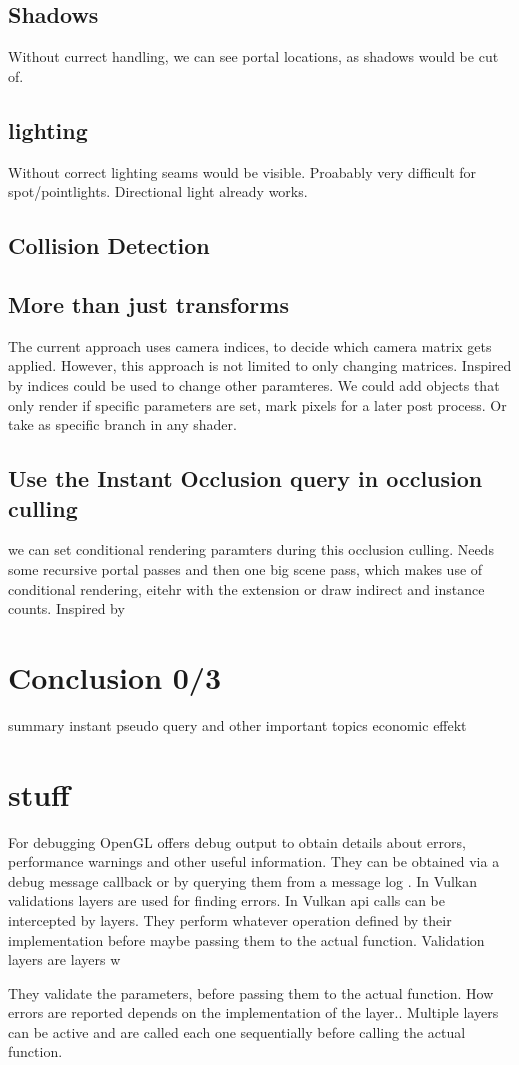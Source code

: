 \subsection{Shadows}
Without currect handling, we can see portal locations, as shadows would be cut of.
\subsection{lighting}
Without correct lighting seams would be visible. Proabably very difficult for spot/pointlights. Directional light already works.
\subsection{Collision Detection}

\subsection{More than just transforms}
\label{more than transforms}
The current approach uses camera indices, to decide which camera matrix gets applied. However, this approach is not limited to only changing matrices. Inspired by \cite{borst:2009:real} indices could be used to change other paramteres. We could add objects that only render if specific parameters are set, mark pixels for a later post process. Or take as specific branch in any shader.


\subsection{Use the Instant Occlusion query in occlusion culling}
we can set conditional rendering paramters during this occlusion culling.
Needs some  recursive portal passes and then one big scene pass, which makes use of conditional rendering, eitehr with the extension or draw indirect and instance counts. Inspired by \cite{yang:2014:walkthrough}

\section{Conclusion 0/3}

summary
instant pseudo query and other important topics
economic effekt

\section*{stuff}
For debugging OpenGL offers debug output to obtain details about errors, performance warnings and other useful information. They can be obtained via a debug message callback or by querying them from a message log \cite{khronos:openGL:spec4.6}. In Vulkan validations layers are used for finding errors. In Vulkan \gls{api} calls can be intercepted by layers. They perform whatever operation defined by their implementation before maybe passing them to the actual function. Validation layers are layers w

They validate the parameters, before passing them to the actual function. How errors are reported depends on the implementation of the layer.. Multiple layers can be active and are called each one sequentially before calling the actual function. \cite{khronos:vulkan:spec1.1}












